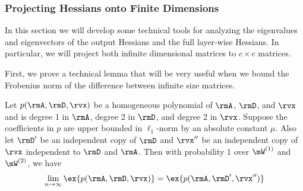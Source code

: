 \subsubsection{Projecting Hessians onto Finite Dimensions}
\label{sec:proof-project}
In this section we will develop some technical tools for analyzing the eigenvalues and eigenvectors of the output Hessians and the full layer-wise Hessians. In particular, we will project both infinite dimensional matrices to $c\times c$ matrices.

First, we prove a technical lemma that will be very useful when we bound the Frobenius norm of the difference between infinite size matrices.
\begin{lemma}
\label{lemma:polynomial}
Let $p(\rmA,\rmD,\rvx)$ be a homogeneous polynomial of $\rmA$, $\rmD$, and $\rvx$ and is degree 1 in $\rmA$, degree 2 in $\rmD$, and degree 2 in $\rvx$. Suppose the coefficients in $p$ are upper bounded in $\ell_1$-norm by an absolute constant $\mu$. Also let $\rmD'$ be an independent copy of $\rmD$ and $\rvx''$ be an independent copy of $\rvx$ independent to $\rmD$ and $\rmA$. Then with probability 1 over $\mW^{(1)}$ and $\mW^{(2)}$, we have
\begin{equation}
    \lim_{n\to\infty}\ex{p(\rmA, \rmD, \rvx)} = \ex{p(\rmA, \rmD', \rvx'')}
\end{equation}
\end{lemma}
